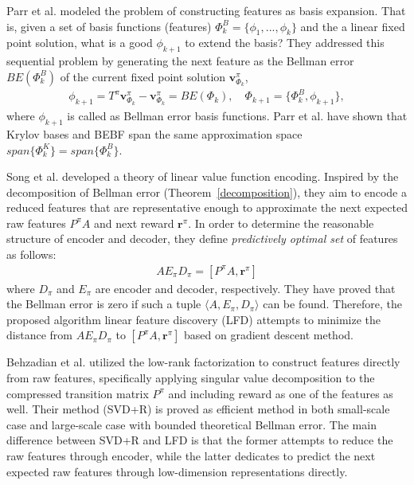 \documentclass[onecolumn, conference]{IEEEtran}
\begin{document}
Parr et al. \cite{Parr2007AnalyzingFG} modeled the problem of constructing features as basis expansion. That is, given a set of basis functions (features) $\Phi_k^B = \{\phi_1,...,\phi_k\}$ and the a linear fixed point solution, what is a good $\phi_{k+1}$ to extend the basis? They addressed this sequential problem by generating the next feature as the Bellman error $BE(\Phi_k^B)$ of the current fixed point solution $\boldsymbol{v}_{\Phi_k}^\pi$,
	\begin{align*}
		\phi_{k+1} = T^\pi \boldsymbol{v}_{\Phi_k}^\pi - \boldsymbol{v}_{\Phi_k}^\pi = BE(\Phi_k), \quad \Phi_{k+1} = \{\Phi_k^B, \phi_{k+1}\},
	\end{align*}
where $\phi_{k+1}$ is called as Bellman error basis functions. Parr et al. \cite{Parr2008AnAO} have shown that Krylov bases and BEBF span the same approximation space $ span\{\Phi^K_k\}=span\{\Phi_k^B\}$. 

Song et al. \cite{Song2016LinearFE} developed a theory of linear value function encoding. Inspired by the decomposition of Bellman error (Theorem~\ref{decomposition}), they aim to encode a reduced features that are representative enough to approximate the next expected raw features $P^\pi A$ and next reward $\boldsymbol{r}^\pi$. In order to determine the reasonable structure of encoder and decoder, they define \textit{predictively optimal set} of features as follows:
	\begin{align*}
		AE_\pi D_\pi = [P^\pi A, \boldsymbol{r}^\pi]
	\end{align*}
where $D_\pi$ and $E_\pi$ are encoder and decoder, respectively. They have proved that the Bellman error is zero if such a tuple $\langle A,E_\pi,D_\pi \rangle$ can be found. Therefore, the proposed algorithm linear feature discovery (LFD) attempts to minimize the distance from $AE_\pi D_\pi$ to $[P^\pi A, \boldsymbol{r}^\pi]$ based on gradient descent method.

Behzadian et al. \cite{Behzadian2019FeatureSB} utilized the low-rank factorization to construct features directly from raw features, specifically applying singular value decomposition to the compressed transition matrix $P^\pi$ and including reward as one of the features as well. Their method (SVD+R) is proved as efficient method in both small-scale case and large-scale case with bounded theoretical Bellman error. The main difference between SVD+R and LFD is that the former attempts to reduce the raw features through encoder, while the latter dedicates to predict the next expected raw features through low-dimension representations directly.
\end{document}
